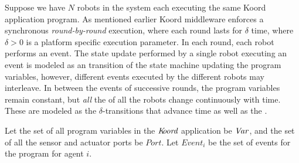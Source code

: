 Suppose we have $N$ robots in the system each executing the same Koord application program. As mentioned earlier Koord middleware enforces a synchronous  \emph{round-by-round} execution, where each round lasts for $\delta$ time, where $\delta >0$ is a platform specific execution parameter.
%
In each round, each robot performs an  event.
The state update performed by a single robot executing an  event is modeled as an  transition of the state machine updating the program variables, however,  different events executed by the different robots may interleave. In between the events of successive rounds, the program variables remain constant, but {\em all\/} the  of all the robots  change continuously with time.  These are modeled as the $\delta$-transitions that advance time as well as the .

%
Let the set of all program variables in the $\emph{K\kern-2pt oord}$ application be $\mathit{Var}$, and the set of all the sensor and actuator ports be $\mathit{Port}$. Let $\mathit{Event}_i$ be the set of events for the program for agent $i$.

